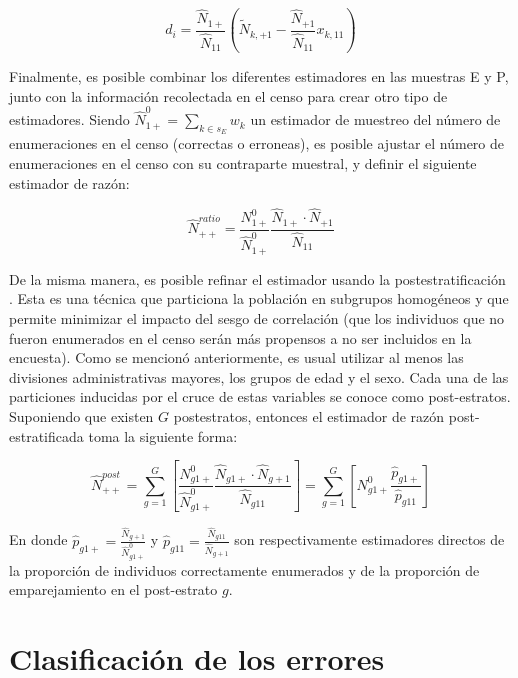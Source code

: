 \documentclass[
  12pt,
]{book}
\begin{document}
\[
d_i = \frac{\hat N_{1+}}{\hat N_{11}} 
\left(\tilde N_{k, +1} - \frac{\hat N_{+1}}{\hat N_{11}}x_{k, 11} \right)  
\]

Finalmente, es posible combinar los diferentes estimadores en las muestras E y P, junto con la información recolectada en el censo para crear otro tipo de estimadores. Siendo \(\hat {N}_{1+}^0 = \sum_{k \in s_E}w_k\) un estimador de muestreo del número de enumeraciones en el censo (correctas o erroneas), es posible ajustar el número de enumeraciones en el censo con su contraparte muestral, y definir el siguiente estimador de razón:

\[
\hat N_{++}^{ratio} = \frac{{N}_{1+}^0}{\hat {N}_{1+}^0} \frac{\hat N_{1+} \cdot \hat{N}_{+1}}{\hat{N}_{11}}
\]

De la misma manera, es posible refinar el estimador usando la postestratificación \citep{Gutierrez_2016}. Esta es una técnica que particiona la población en subgrupos homogéneos y que permite minimizar el impacto del sesgo de correlación (que los individuos que no fueron enumerados en el censo serán más propensos a no ser incluidos en la encuesta). Como se mencionó anteriormente, es usual utilizar al menos las divisiones administrativas mayores, los grupos de edad y el sexo. Cada una de las particiones inducidas por el cruce de estas variables se conoce como post-estratos. Suponiendo que existen \(G\) postestratos, entonces el estimador de razón post-estratificada toma la siguiente forma:

\[
\hat N_{++}^{post} = \sum_{g=1}^G \left[ \frac{{N}_{g1+}^0}{\hat {N}_{g1+}^0} \frac{\hat N_{g1+} \cdot \hat{N}_{g+1}}{\hat{N}_{g11}} \right] =
\sum_{g=1}^G \left[ {N}_{g1+}^0 \frac{\hat p_{g1+}}{\hat p_{g11}}  \right]
\]

En donde \(\hat p_{g1+} = \frac{\hat{N}_{g+1}}{\hat {N}_{g1+}^0}\) y \(\hat p_{g11} = \frac{\hat{N}_{g11}}{\hat{N}_{g+1}}\) son respectivamente estimadores directos de la proporción de individuos correctamente enumerados y de la proporción de emparejamiento en el post-estrato \(g\).

\hypertarget{clasificaciuxf3n-de-los-errores}{%
\chapter{Clasificación de los errores}\label{clasificaciuxf3n-de-los-errores}}

  
\end{document}
